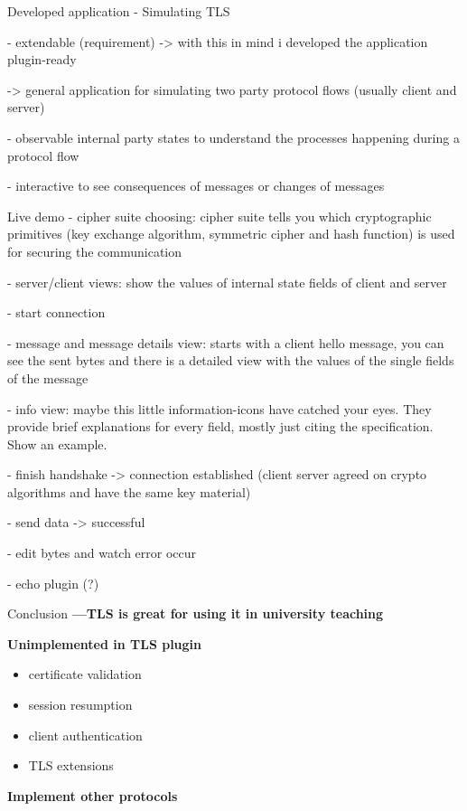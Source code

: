 
\begin{frame} {Developed application}
- Simulating TLS

- extendable (requirement) -> with this in mind i developed the application plugin-ready 

-> general application for simulating two party protocol flows (usually client and server)

- observable internal party states to understand the processes happening during a protocol flow

- interactive to see consequences of messages or changes of messages
\end{frame}

\begin{frame} {Live demo}
- cipher suite choosing: cipher suite tells you which cryptographic primitives (key exchange algorithm, symmetric cipher and hash function) is used for securing the communication

- server/client views: show the values of internal state fields of client and server 

- start connection

- message and message details view: starts with a client hello message, you can see the sent bytes and there is a detailed view with the values of the single fields of the message

- info view: maybe this little information-icons have catched your eyes. They provide brief explanations for every field, mostly just citing the specification. Show an example.

- finish handshake -> connection established (client server agreed on crypto algorithms and have the same key material)

- send data -> successful

- edit bytes and watch error occur

- echo plugin (?)

\end{frame}

\begin{frame}{Conclusion}
\textbf{---TLS is great for using it in university teaching}

\textbf{Unimplemented in TLS plugin}

\begin{itemize}
	\item certificate validation
	\item session resumption
	\item client authentication
	\item TLS extensions
\end{itemize}

\textbf{Implement other protocols}
\end{frame}

